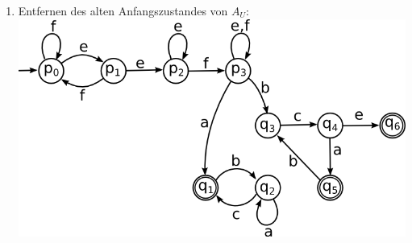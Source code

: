 \documentclass{article}
\begin{document}
\begin{enumerate}
\item Entfernen des alten Anfangszustandes von $A_U$:\\
\includegraphics[width=\textwidth]{AwAu2.png}
\end{enumerate}
\end{document}

